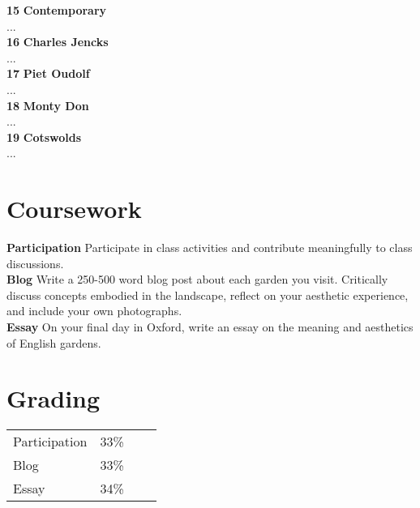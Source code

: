 \documentclass[11pt,article,oneside]{memoir}
\begin{document}
\noindent \textbf{15} 
\enspace
\textbf{Contemporary}
\\
\noindent
...
\\

\noindent \textbf{16} 
\enspace
\textbf{Charles Jencks}
\\
\noindent
...
\\

\noindent \textbf{17} 
\enspace
\textbf{Piet Oudolf}
\\
\noindent
...
\\

\noindent \textbf{18} 
\enspace
\textbf{Monty Don}
\\
\noindent
...
\\

\noindent \textbf{19} 
\enspace
\textbf{Cotswolds}
\\
\noindent
...
\\


\section{Coursework}

\noindent \textbf{Participation}
\enspace
Participate in class activities 
and contribute meaningfully to class discussions.
\\

\noindent \textbf{Blog}
\enspace
Write a 250-500 word blog post about each garden you visit. 
Critically discuss concepts embodied in the landscape, 
reflect on your aesthetic experience,  
and include your own photographs.
\\

\noindent \textbf{Essay}
\enspace
On your final day in Oxford, 
write an essay on the meaning and aesthetics 
of English gardens.
\\


\section{Grading}
\vspace*{-0.4cm}
\begin{table}[H]
\begin{tabular}{@{}l r @{\hskip 2cm} l @{\hskip 0.5cm} l}
Participation & 33\%\\
Blog & 33\% \\
Essay & 34\% \\
\end{tabular}
\end{table}
\end{document}

